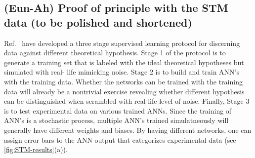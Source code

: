 \documentclass[aps,prb,floatfix,amsmath,amssymb,amsfonts,10pt,floatfix,longbibliography]{revtex4-1}
\begin{document}
\begin{enumerate}





\subsection{(Eun-Ah) Proof of principle with the STM data (to be polished and shortened)}
 Ref.~\cite{Zhang2018} have developed a three stage supervised learning protocol for discerning data against different theoretical hypothesis.
Stage
1 of the protocol is to 
generate a training set that
is labeled with the ideal theoretical
hypotheses but simulated with real-
life mimicking noise. Stage 2 is to  build and train 
ANN’s with the training data.
Whether the networks  can be trained with the
training data will already be a nontrivial
exercise revealing whether different hypothesis
 can be distinguished
when scrambled with real-life level of
noise. 
Finally, Stage 3 is to test
experimental data on various
trained ANNs. Since the training of ANN's is a stochastic process, multiple ANN's trained simulatneously will generally have different weights and biases. By having different networks, one can assign error bars to the ANN output that categorizes experimental data (see \ref{fig:STM-results}(a)).


\end{enumerate}
\end{document}
